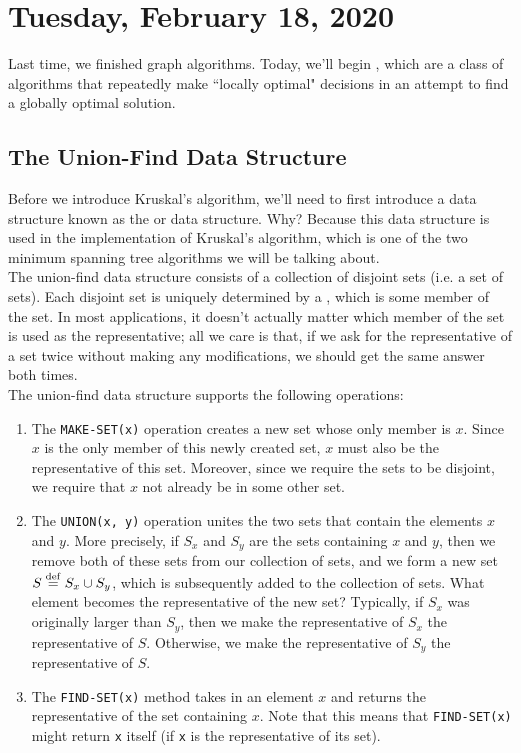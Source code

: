 \newpage

\section{Tuesday, February 18, 2020}

Last time, we finished graph algorithms. Today, we'll begin , which are a class of algorithms that repeatedly make ``locally optimal" decisions in an attempt to find a globally optimal solution.


\subsection{The Union-Find Data Structure}

Before we introduce Kruskal's algorithm, we'll need to first introduce a data structure known as the  or  data structure. Why? Because this data structure is used in the implementation of Kruskal's algorithm, which is one of the two minimum spanning tree algorithms we will be talking about. \\

The union-find data structure consists of a collection of disjoint sets (i.e. a set of sets). Each disjoint set is uniquely determined by a , which is some member of the set. In most applications, it doesn't actually matter which member of the set is used as the representative; all we care is that, if we ask for the representative of a set twice without making any modifications, we should get the same answer both times. \\

The union-find data structure supports the following operations:

\begin{enumerate}
    \item The \verb!MAKE-SET(x)! operation creates a new set whose only member is $x$. Since $x$ is the only member of this newly created set, $x$ must also be the representative of this set. Moreover, since we require the sets to be disjoint, we require that $x$ not already be in some other set.
    \item The \verb!UNION(x, y)! operation unites the two sets that contain the elements $x$ and $y$. More precisely, if $S_x$ and $S_y$ are the sets containing $x$ and $y$, then we remove both of these sets from our collection of sets, and we form a new set $S \overset{\mathrm{def}}{=} S_x \cup S_y$, which is subsequently added to the collection of sets. What element becomes the representative of the new set? Typically, if $S_x$ was originally larger than $S_y$, then we make the representative of $S_x$ the representative of $S$. Otherwise, we make the representative of $S_y$ the representative of $S$.
    \item The \verb!FIND-SET(x)! method takes in an element $x$ and returns the representative of the set containing $x$. Note that this means that \verb!FIND-SET(x)! might return \verb!x! itself (if \verb!x! is the representative of its set). 
\end{enumerate}


